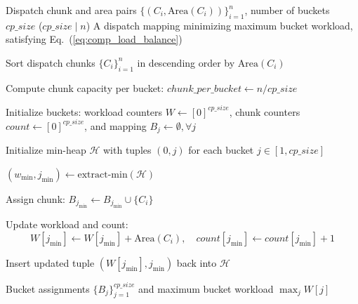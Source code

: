 \begin{algorithm}[htbp]
\caption{Greedy Load-Balance Dispatch Algorithm via Min-Heap w.r.t.~\ref{sec:magiattn_comp}}
\label{alg:minhp}
\begin{algorithmic}[1]
\REQUIRE Dispatch chunk and area pairs $\{(C_i, \mathrm{Area}(C_i))\}_{i=1}^n$, number of buckets $cp\_size$ ($cp\_size \mid n$)
\ENSURE A dispatch mapping minimizing maximum bucket workload, satisfying Eq.~(\ref{eq:comp_load_balance})

\STATE Sort dispatch chunks $\{C_i\}_{i=1}^n$ in descending order by $\mathrm{Area}(C_i)$

\STATE Compute chunk capacity per bucket: $chunk\_per\_bucket \gets n / cp\_size$

\STATE Initialize buckets: workload counters $W \gets [0]^{cp\_size}$, chunk counters $count \gets [0]^{cp\_size}$, and mapping $B_j \gets \emptyset, \forall j$

\STATE Initialize min-heap $\mathcal{H}$ with tuples $(0, j)$ for each bucket $j \in [1, cp\_size]$

    \REPEAT
        \STATE $(w_{\text{min}}, j_{\text{min}}) \gets \text{extract-min}(\mathcal{H})$
     

    \STATE Assign chunk: $B_{j_{\text{min}}} \gets B_{j_{\text{min}}} \cup \{C_i\}$
    
    \STATE Update workload and count:
    \[
    W[j_{\text{min}}] \gets W[j_{\text{min}}] + \mathrm{Area}(C_i), \quad count[j_{\text{min}}] \gets count[j_{\text{min}}] + 1
    \]

    \STATE Insert updated tuple $(W[j_{\text{min}}], j_{\text{min}})$ back into $\mathcal{H}$

\ENDFOR

\RETURN Bucket assignments $\{B_j\}_{j=1}^{cp\_size}$ and maximum bucket workload $\max_j W[j]$

\end{algorithmic}
\end{algorithm}








    




